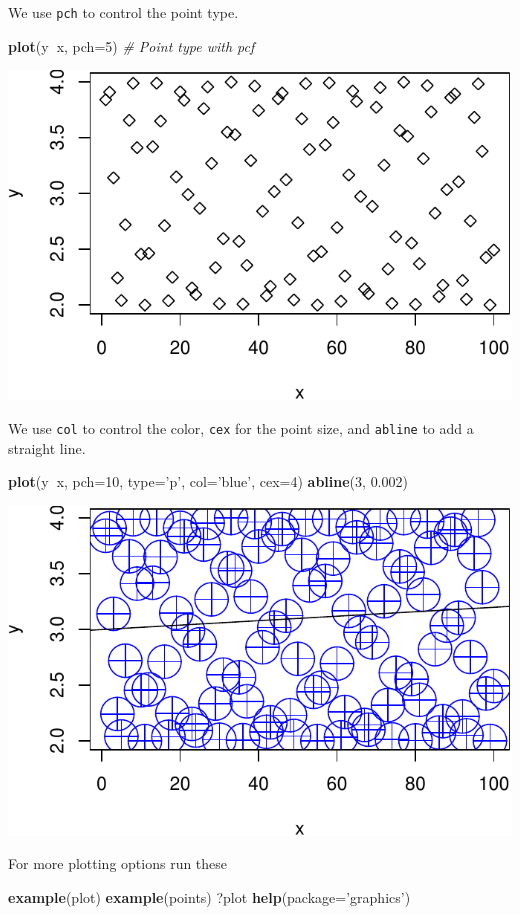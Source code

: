 \documentclass[]{book}
\newenvironment{Shaded}{\begin{snugshade}}{\end{snugshade}}
\newcommand{\KeywordTok}[1]{\textcolor[rgb]{0.13,0.29,0.53}{\textbf{#1}}}
\newcommand{\DataTypeTok}[1]{\textcolor[rgb]{0.13,0.29,0.53}{#1}}
\newcommand{\DecValTok}[1]{\textcolor[rgb]{0.00,0.00,0.81}{#1}}
\newcommand{\FloatTok}[1]{\textcolor[rgb]{0.00,0.00,0.81}{#1}}
\newcommand{\StringTok}[1]{\textcolor[rgb]{0.31,0.60,0.02}{#1}}
\newcommand{\CommentTok}[1]{\textcolor[rgb]{0.56,0.35,0.01}{\textit{#1}}}
\newcommand{\OperatorTok}[1]{\textcolor[rgb]{0.81,0.36,0.00}{\textbf{#1}}}
\newcommand{\NormalTok}[1]{#1}
\theoremstyle{definition}
\theoremstyle{definition}
\theoremstyle{definition}
\theoremstyle{remark}
\begin{document}
We use \texttt{pch} to control the point type.

\begin{Shaded}
\begin{Highlighting}[]
\KeywordTok{plot}\NormalTok{(y}\OperatorTok{~}\NormalTok{x, }\DataTypeTok{pch=}\DecValTok{5}\NormalTok{) }\CommentTok{# Point type with pcf}
\end{Highlighting}
\end{Shaded}

\includegraphics[width=0.5\linewidth]{Rcourse_files/figure-latex/unnamed-chunk-36-1}

We use \texttt{col} to control the color, \texttt{cex} for the point
size, and \texttt{abline} to add a straight line.

\begin{Shaded}
\begin{Highlighting}[]
\KeywordTok{plot}\NormalTok{(y}\OperatorTok{~}\NormalTok{x, }\DataTypeTok{pch=}\DecValTok{10}\NormalTok{, }\DataTypeTok{type=}\StringTok{'p'}\NormalTok{, }\DataTypeTok{col=}\StringTok{'blue'}\NormalTok{, }\DataTypeTok{cex=}\DecValTok{4}\NormalTok{) }
\KeywordTok{abline}\NormalTok{(}\DecValTok{3}\NormalTok{, }\FloatTok{0.002}\NormalTok{) }
\end{Highlighting}
\end{Shaded}

\includegraphics[width=0.5\linewidth]{Rcourse_files/figure-latex/unnamed-chunk-37-1}

For more plotting options run these

\begin{Shaded}
\begin{Highlighting}[]
\KeywordTok{example}\NormalTok{(plot)}
\KeywordTok{example}\NormalTok{(points)}
\NormalTok{?plot}
\KeywordTok{help}\NormalTok{(}\DataTypeTok{package=}\StringTok{'graphics'}\NormalTok{)}
\end{Highlighting}
\end{Shaded}
\end{document}
